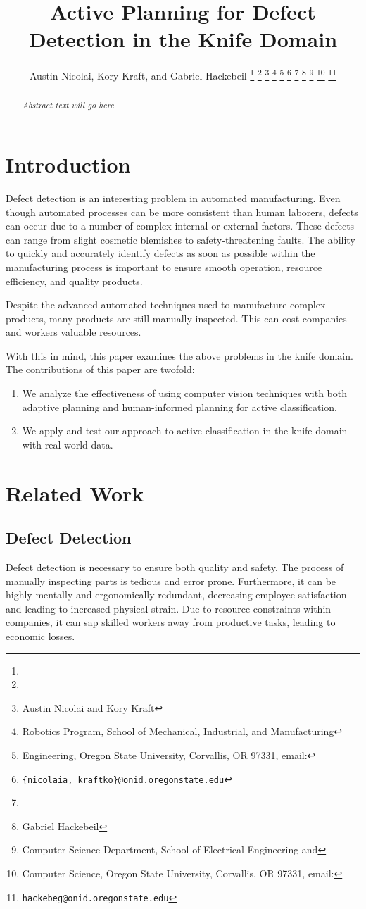 \documentclass[letterpaper, 10 pt, conference]{ieeeconf}  %
\title{\LARGE \bf 
Active Planning for Defect Detection in the Knife Domain
}
\author{Austin Nicolai, Kory Kraft, and Gabriel Hackebeil%
\thanks{\hrulefill}
\thanks{\hfill}
\thanks{Austin Nicolai and Kory Kraft}
\thanks{Robotics Program, School of Mechanical, Industrial, and Manufacturing}
\thanks{Engineering, Oregon State University, Corvallis, OR 97331, email: }
\thanks{{\tt\small \{nicolaia, kraftko\}@onid.oregonstate.edu}}
\thanks{\hfill}
\thanks{Gabriel Hackebeil}
\thanks{Computer Science Department, School of Electrical Engineering and}
\thanks{Computer Science, Oregon State University, Corvallis, OR 97331, email: }
\thanks{{\tt\small hackebeg@onid.oregonstate.edu}}
}
\begin{document}
\maketitle
\thispagestyle{empty}
\pagestyle{empty}

\begin{abstract}
\textit{Abstract text will go here}
\end{abstract}


\section{Introduction}

Defect detection is an interesting problem in automated manufacturing. Even though automated processes can be more consistent than human laborers, defects can occur due to a number of complex internal or external factors.  These defects can range from slight cosmetic blemishes to safety-threatening faults. The ability to quickly and accurately identify defects as soon as possible within the manufacturing process is important to ensure smooth operation, resource efficiency, and quality products.

Despite the advanced automated techniques used to manufacture complex products, many products are still manually inspected. This can cost companies and workers valuable resources.

With this in mind, this paper examines the above problems in the knife domain. The contributions of this paper are twofold:\\

\begin{enumerate}
	\item[1.] We analyze the effectiveness of using computer vision techniques with both adaptive planning and human-informed planning for active classification.\\
	\item[2.] We apply and test our approach to active classification in the knife domain with real-world data.\\
\end{enumerate}

\section{Related Work}

\subsection{Defect Detection}
Defect detection is necessary to ensure both quality and safety. The process of manually inspecting parts is tedious and error prone. Furthermore, it can be highly mentally and ergonomically redundant, decreasing employee satisfaction and leading to increased physical strain. Due to resource constraints within companies, it can sap skilled workers away from productive tasks, leading to economic losses.
\end{document}

